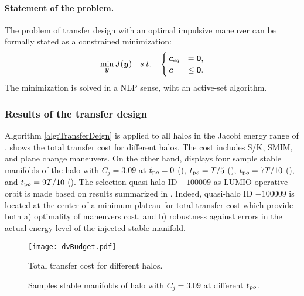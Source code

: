 \paragraph{Statement of the problem.}
	The problem of transfer design with an optimal impulsive maneuver can be formally stated as a constrained minimization:
	\begin{align}\label{pb:minimizaionTransferDesign}
	\min_{\boldsymbol{y}}{J(\boldsymbol{y})}\quad s.t. \quad
	\begin{cases}
	\boldsymbol{c}_{eq} &= \boldsymbol{0}, \\
	\boldsymbol{c} &\le \boldsymbol{0}.
	\end{cases}
	\end{align}
	The minimization is solved in a {NLP} sense, wiht an active-set algorithm.


\subsubsection{Results of the transfer design }\label{subsubsec:TransferDesignResults}
Algorithm \ref{alg:TransferDeign} is applied to all halos in the Jacobi energy range of .  shows the total transfer cost for different halos. The cost includes S/K, SMIM, and plane change maneuvers. On the other hand,  displays four sample stable manifolds of the halo with $C_j = 3.09$ at $t_{\textrm po}=0$ (), $t_{\textrm po}=T/5$ (), $t_{\textrm po}=7T/10$ (), and $t_{\textrm po}=9T/10$ (). The selection quasi-halo ID $-100009$ as LUMIO operative orbit is made based on results summarized in . Indeed, quasi-halo ID $-100009$ is located at the center of a minimum plateau for total transfer cost which provide both a) optimality of maneuvers cost, and b) robustness against errors in the actual energy level of the injected stable manifold.
%
\begin{figure}[b!]
	\centering
	\texttt{[image: dvBudget.pdf]}
	\caption{Total transfer cost for different halos.}
	\label{fig:TotalTransferCost}
\end{figure}
%
%
\begin{figure}[]
	\centering
	\hfill
	\hfill
	\hfill
	\hfill
	\hfill
	\caption[Stable manifolds of operative halo]{Samples stable manifolds of halo with $C_j = 3.09$ at different $t_{\textrm po}$.}
	\label{fig:Halo9SampleStableManifold}
\end{figure}
%

